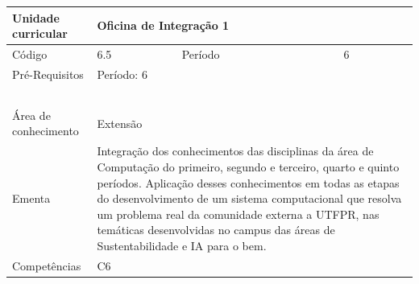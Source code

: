 \clearpage
\newpage

\begin{quadro}[ht!]
  \centering\scriptsize
\caption{Unidade Curricular Oficina de Integração 1}

\begin{tabular}{|p{2.5cm}|p{2.5cm}|p{2.5cm}|p{2.5cm}|p{2.5cm}|}\hline

  Unidade curricular & \multicolumn{4}{p{10cm}|}{ Oficina de Integração 1 }\\\hline
  Código & 6.5 & Período & \multicolumn{2}{p{5cm}|}{ 6 }\\\hline
  Pré-Requisitos & \multicolumn{4}{p{10cm}|}{ Período: 6 } \\\hline
  \cellcolor{blue1}{ CH PRESENCIAL } &
    \cellcolor{blue1}{CH EAD Síncrona} &
    \cellcolor{blue1}{CH EAD Síncrona Mediada} &
    \cellcolor{blue1}{CH EAD Assíncrona} &
    \cellcolor{blue1}{CH APCC} \\\hline
  \cellcolor{blue1}{ 120 } &
    \cellcolor{blue1}{ 0 } &
    \cellcolor{blue1}{ 0 } &
    \cellcolor{blue1}{ 0 } &
    \cellcolor{blue1}{0} \\\hline
  \cellcolor{blue1}{ CH Teórica } &
    \cellcolor{blue1}{CH Prática} &
    \cellcolor{blue1}{CH Humanidades} &
    \cellcolor{blue1}{CH Extensão} &
    \cellcolor{blue1}{CH EAD TOTAL} \\\hline
  \cellcolor{blue1}{ 0 } &
    \cellcolor{blue1}{ 0 } &
    \cellcolor{blue1}{ 0 } &
    \cellcolor{blue1}{ 120 } &
    \cellcolor{blue1}{ 0 } \\\hline
  \cellcolor{blue1}{CARGA-HORÁRIA TOTAL} & \multicolumn{4}{p{10cm}|}{ \cellcolor{blue1}{ 120 } } \\\hline
  Área de conhecimento & \multicolumn{4}{p{10cm}|}{ Extensão } \\\hline
  Ementa & \multicolumn{4}{p{10cm}|}{ Integração dos conhecimentos das disciplinas da área de Computação do primeiro, segundo e terceiro, quarto e quinto períodos. Aplicação desses conhecimentos em todas as etapas do desenvolvimento de um sistema computacional que resolva um problema real da comunidade externa a UTFPR, nas temáticas desenvolvidas no campus das áreas de Sustentabilidade e IA para o bem. } \\\hline
  Competências & \multicolumn{4}{p{10cm}|}{ C6 } \\\hline


  
	\end{tabular}

\end{quadro}


